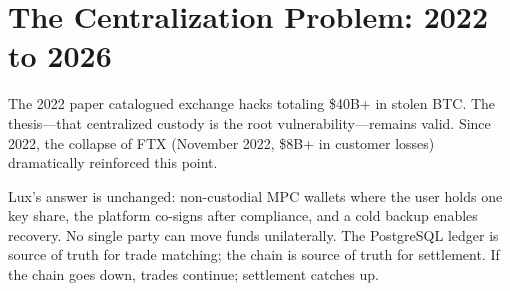\section{The Centralization Problem: 2022 to 2026}


The 2022 paper catalogued exchange hacks totaling \$40B+ in
stolen BTC. The thesis---that centralized custody is the root
vulnerability---remains valid. Since 2022, the collapse of FTX
(November 2022, \$8B+ in customer losses) dramatically reinforced
this point.

Lux's answer is unchanged: non-custodial MPC wallets where the
user holds one key share, the platform co-signs after compliance,
and a cold backup enables recovery. No single party can move funds
unilaterally. The PostgreSQL ledger is source of truth for trade
matching; the chain is source of truth for settlement. If the chain
goes down, trades continue; settlement catches up.

